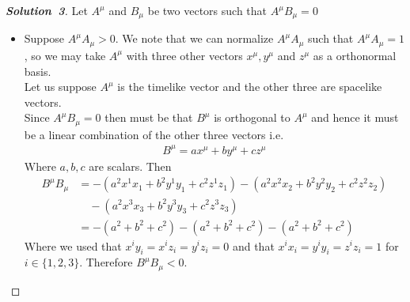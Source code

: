 \documentclass[11pt]{article}
\theoremstyle{definition}
\renewcommand*{\proofname}{\bf{Solution}}
\begin{document}
\cleardoublepage
\begin{proof}[\proofname\ 3]
Let $A^\mu$ and $B_{\mu}$ be two vectors such that $A^\mu B_\mu = 0$
\begin{itemize}
\item [(a)] Suppose $A^\mu A_\mu > 0$. We note that we can normalize
$A^\mu A_\mu$ such that $A^\mu A_\mu = 1$, so we may take $A^\mu$ with three
other vectors $x^\mu, y^\mu$ and $z^\mu$ as a orthonormal basis.\\
Let us suppose $A^\mu$ is the timelike vector and the other three are spacelike
vectors. \\
Since $A^\mu B_\mu = 0$ then must be that $B^\mu$ is orthogonal to $A^\mu$
and hence it must be a linear combination of the other three vectors i.e.
\begin{align*}
    B^\mu = a x^\mu + b y^\mu + c z^\mu
\end{align*}
Where $a,b,c$ are scalars. Then
\begin{align*}
    B^\mu B_\mu
    &= -(a^2 x^1x_1 + b^2 y^1y_1 + c^2 z^1z_1)
    -(a^2 x^2x_2 + b^2 y^2y_2 + c^2 z^2z_2) \\
    &\quad -(a^2 x^3x_3 + b^2 y^3y_3 + c^2 z^3z_3) \\
    &= -(a^2 + b^2 + c^2) -(a^2 + b^2 + c^2) -(a^2 + b^2 + c^2)
\end{align*}
Where we used that $x^iy_i = x^iz_i = y^iz_i = 0$ and that 
$x^ix_i = y^iy_i = z^iz_i = 1$ for $i \in \{1,2,3\}$.
Therefore $B^\mu B_\mu < 0$.


\end{itemize}
\end{proof}
\end{document}
